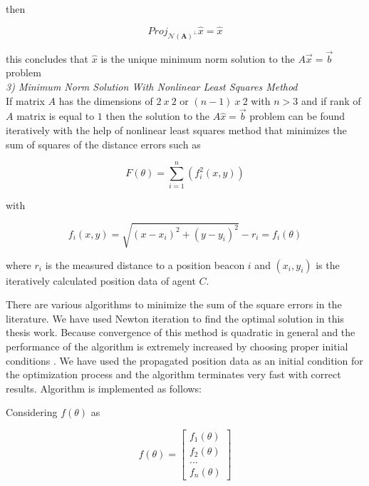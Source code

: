 then 
  
\begin{equation}
Proj_{ \mathcal{N}(\mathbf{A})^\perp}\hat{x} = \hat{x}
\end{equation}
  
this concludes that $\hat{x}$ is the unique minimum norm solution to the $A\vec{x} = \vec{b}$ problem\\
	
	
\textit{3) Minimum Norm Solution With Nonlinear Least Squares Method}\\	
If matrix $A$ has the dimensions of $2\ x\ 2$ or $(n-1)\ x\ 2$ with $n>3$ and if rank of $A$ matrix is equal to $1$ then the solution to the $A\hat{x} = \vec{b}$ problem can be found iteratively with the help of nonlinear least squares method that minimizes the sum of squares of the distance errors such as \cite{22}
	
\begin{equation}
F(\theta) = \sum_{i=1}^{n} \left(f_i^2(x,y)\right)
\end{equation}
	
with
	
\begin{equation}
f_i(x,y) = \sqrt{(x-x_i)^2 + (y - y_i)^2} - r_i = f_i(\theta) 
\end{equation}

where $r_i$ is the measured distance to a position beacon $i$ and $(x_i, y_i)$ is the iteratively calculated position data of agent $C$.

There are various algorithms to minimize the sum of the square errors in the literature. We have used Newton iteration to find the optimal solution in this thesis work. Because convergence of this method is quadratic in general and the performance of the algorithm is extremely increased by choosing proper initial conditions \cite{wiki_newton}. We have used the propagated position data as an initial condition for the optimization process and the algorithm terminates very fast with correct results. Algorithm is implemented as follows:

Considering  $f(\theta)$ as

\begin{equation}
f(\theta) = \begin{bmatrix}
f_1(\theta) \\
f_2(\theta) \\
...         \\
f_n(\theta)
\end{bmatrix}
\end{equation}


